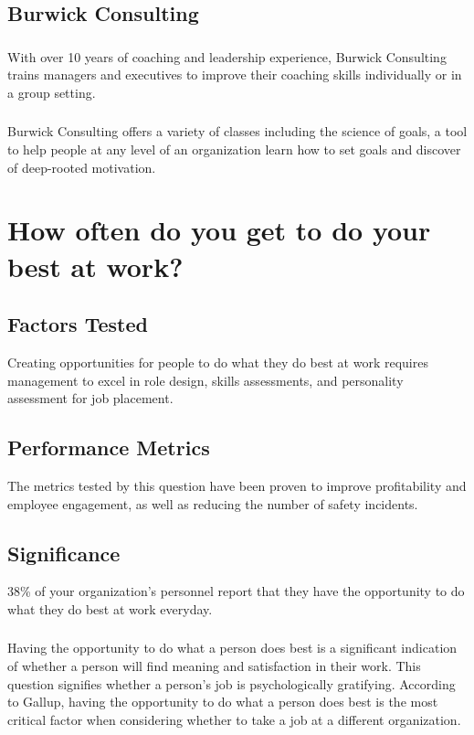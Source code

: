 \documentclass[14pt]{extreport}
\begin{document}
\newpage
\subsection*{\centering Burwick Consulting}
\subsubsection*{}
With over 10 years of coaching and leadership experience, Burwick Consulting trains managers and executives to improve their coaching skills individually or in a group setting.
\subsubsection*{}
Burwick Consulting offers a variety of classes including the science of goals, a tool to help people at any level of an organization learn how to set goals and discover of deep-rooted motivation.

\newpage
\section*{How often do you get to do your best at work?}

\subsection*{\centering Factors Tested}
Creating opportunities for people to do what they do best at work requires management to excel in role design, skills assessments, and personality assessment for job placement. 
\subsection*{\centering Performance Metrics}
The metrics tested by this question have been proven to improve profitability and employee engagement, as well as reducing the number of safety incidents. 

\subsection*{\centering Significance}
38\% of your organization’s personnel report
that they have the opportunity to do what they do best at work everyday.
\subsubsection*{}
Having the opportunity to do what a person does best is a significant
indication of whether a person will find meaning and satisfaction in their work.  This question signifies whether a person's job is psychologically gratifying. According to Gallup, having the opportunity to do what a person does best is the most critical factor when considering whether to take a job at a different organization.
\end{document}
